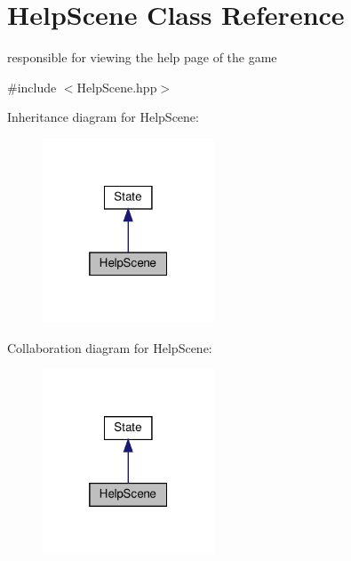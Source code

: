 \hypertarget{classHelpScene}{}\section{Help\+Scene Class Reference}
\label{classHelpScene}


responsible for viewing the help page of the game  




{\ttfamily \#include $<$Help\+Scene.\+hpp$>$}



Inheritance diagram for Help\+Scene\+:
\nopagebreak
\begin{figure}[H]
\begin{center}
\leavevmode
\includegraphics[width=145pt]{classHelpScene__inherit__graph}
\end{center}
\end{figure}


Collaboration diagram for Help\+Scene\+:
\nopagebreak
\begin{figure}[H]
\begin{center}
\leavevmode
\includegraphics[width=145pt]{classHelpScene__coll__graph}
\end{center}
\end{figure}
